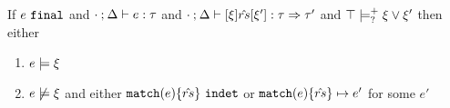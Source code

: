 \begin{lem}
  \label{lemma:indet-match-progress}
  If $e ~\mathtt{final}$ and $\cdot \mathbin{;} \Delta \vdash e : \tau$ and $\cdot \mathbin{;} \Delta \vdash [\xi] \hat{rs} [\xi'] : \tau \Rightarrow \tau'$ and $\top \models_{?}^{+} \xi \vee \xi'$
  then either
  \begin{enumerate}
    \item $e \models \xi$
    \item $e \not\models \xi$ and either $\mathtt{match}(e) \{\hat{rs}\} ~\mathtt{indet}$ or $\mathtt{match}(e) \{\hat{rs}\} \mapsto e'$ for some $e'$
  \end{enumerate}
\end{lem}
